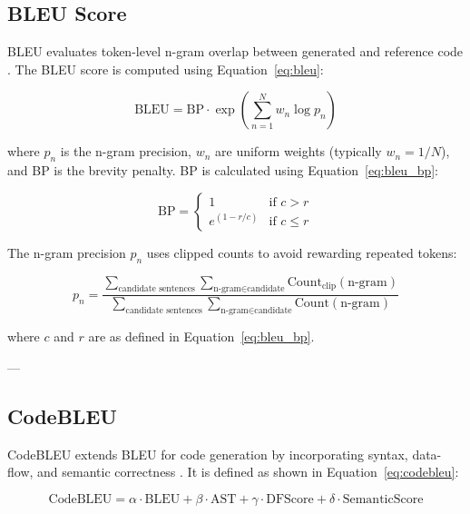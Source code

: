 \subsection{BLEU Score}

BLEU evaluates token-level n-gram overlap between generated and reference code \cite{Papineni2002}. 
The BLEU score is computed using Equation~\eqref{eq:bleu}:

\begin{equation}\label{eq:bleu}
	\text{BLEU} = \text{BP} \cdot \exp\left(\sum_{n=1}^{N} w_n \log p_n\right)
\end{equation}

where $p_n$ is the n-gram precision, $w_n$ are uniform weights (typically $w_n = 1/N$), and BP is the brevity penalty. 
BP is calculated using Equation~\eqref{eq:bleu_bp}:

\begin{equation}\label{eq:bleu_bp}
	\text{BP} =
	\begin{cases} 
	1 & \text{if } c > r \\
	e^{(1-r/c)} & \text{if } c \leq r
	\end{cases}
\end{equation}

The n-gram precision $p_n$ uses clipped counts to avoid rewarding repeated tokens:

\begin{equation}\label{eq:pn}
p_{n}=
\frac{
\sum_{\text{candidate sentences}}
\sum_{\text{n-gram} \in \text{candidate}}
\text{Count}_{\text{clip}}(\text{n-gram})
}{
\sum_{\text{candidate sentences}}
\sum_{\text{n-gram} \in \text{candidate}}
\text{Count}(\text{n-gram})
}
\end{equation}

where $c$ and $r$ are as defined in Equation~\eqref{eq:bleu_bp}.

---

\subsection{CodeBLEU}

CodeBLEU extends BLEU for code generation by incorporating syntax, data-flow, and semantic correctness \cite{Brown2020}. 
It is defined as shown in Equation~\eqref{eq:codebleu}:

\begin{equation}\label{eq:codebleu}
\text{CodeBLEU} =
\alpha \cdot \text{BLEU}
+ \beta \cdot \text{AST}
+ \gamma \cdot \text{DFScore}
+ \delta \cdot \text{SemanticScore}
\end{equation}

